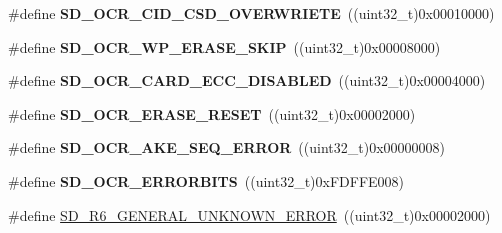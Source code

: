 \begin{DoxyCompactItemize}
\item 
\#define {\bfseries S\+D\+\_\+\+O\+C\+R\+\_\+\+C\+I\+D\+\_\+\+C\+S\+D\+\_\+\+O\+V\+E\+R\+W\+R\+I\+E\+TE}~((uint32\+\_\+t)0x00010000)\hypertarget{group___s_t_m324x_g___e_v_a_l___s_d_i_o___s_d___private___defines_ga5a2a4ac30f0b473c87f283c9b25508c7}{}\label{group___s_t_m324x_g___e_v_a_l___s_d_i_o___s_d___private___defines_ga5a2a4ac30f0b473c87f283c9b25508c7}

\item 
\#define {\bfseries S\+D\+\_\+\+O\+C\+R\+\_\+\+W\+P\+\_\+\+E\+R\+A\+S\+E\+\_\+\+S\+K\+IP}~((uint32\+\_\+t)0x00008000)\hypertarget{group___s_t_m324x_g___e_v_a_l___s_d_i_o___s_d___private___defines_gafe54250dcb2461950611828b409b8c42}{}\label{group___s_t_m324x_g___e_v_a_l___s_d_i_o___s_d___private___defines_gafe54250dcb2461950611828b409b8c42}

\item 
\#define {\bfseries S\+D\+\_\+\+O\+C\+R\+\_\+\+C\+A\+R\+D\+\_\+\+E\+C\+C\+\_\+\+D\+I\+S\+A\+B\+L\+ED}~((uint32\+\_\+t)0x00004000)\hypertarget{group___s_t_m324x_g___e_v_a_l___s_d_i_o___s_d___private___defines_ga4e3e8df5237733fa61ced5304d6e25b8}{}\label{group___s_t_m324x_g___e_v_a_l___s_d_i_o___s_d___private___defines_ga4e3e8df5237733fa61ced5304d6e25b8}

\item 
\#define {\bfseries S\+D\+\_\+\+O\+C\+R\+\_\+\+E\+R\+A\+S\+E\+\_\+\+R\+E\+S\+ET}~((uint32\+\_\+t)0x00002000)\hypertarget{group___s_t_m324x_g___e_v_a_l___s_d_i_o___s_d___private___defines_ga67cbe1781e4db67d3b2fe422ba63de09}{}\label{group___s_t_m324x_g___e_v_a_l___s_d_i_o___s_d___private___defines_ga67cbe1781e4db67d3b2fe422ba63de09}

\item 
\#define {\bfseries S\+D\+\_\+\+O\+C\+R\+\_\+\+A\+K\+E\+\_\+\+S\+E\+Q\+\_\+\+E\+R\+R\+OR}~((uint32\+\_\+t)0x00000008)\hypertarget{group___s_t_m324x_g___e_v_a_l___s_d_i_o___s_d___private___defines_ga2b6aa7c64b853586d3eecfd251d7709f}{}\label{group___s_t_m324x_g___e_v_a_l___s_d_i_o___s_d___private___defines_ga2b6aa7c64b853586d3eecfd251d7709f}

\item 
\#define {\bfseries S\+D\+\_\+\+O\+C\+R\+\_\+\+E\+R\+R\+O\+R\+B\+I\+TS}~((uint32\+\_\+t)0x\+F\+D\+F\+F\+E008)\hypertarget{group___s_t_m324x_g___e_v_a_l___s_d_i_o___s_d___private___defines_gace772bc4b0b2fdf6488e308afe8f29d1}{}\label{group___s_t_m324x_g___e_v_a_l___s_d_i_o___s_d___private___defines_gace772bc4b0b2fdf6488e308afe8f29d1}

\item 
\#define \hyperlink{group___s_t_m324x_g___e_v_a_l___s_d_i_o___s_d___private___defines_ga77d65e0cdecf792a2928b61cc85ed687}{S\+D\+\_\+\+R6\+\_\+\+G\+E\+N\+E\+R\+A\+L\+\_\+\+U\+N\+K\+N\+O\+W\+N\+\_\+\+E\+R\+R\+OR}~((uint32\+\_\+t)0x00002000)\hypertarget{group___s_t_m324x_g___e_v_a_l___s_d_i_o___s_d___private___defines_ga77d65e0cdecf792a2928b61cc85ed687}{}\label{group___s_t_m324x_g___e_v_a_l___s_d_i_o___s_d___private___defines_ga77d65e0cdecf792a2928b61cc85ed687}


\end{DoxyCompactItemize}

